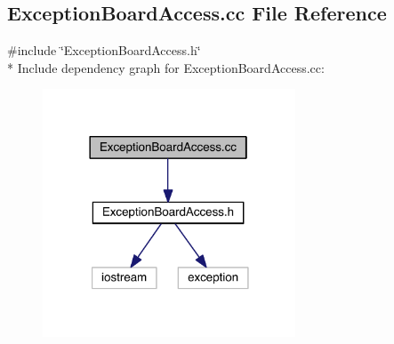 \hypertarget{a00101}{}\subsection{Exception\+Board\+Access.\+cc File Reference}
\label{a00101}
{\ttfamily \#include \char`\"{}Exception\+Board\+Access.\+h\char`\"{}}\\*
Include dependency graph for Exception\+Board\+Access.\+cc\+:\nopagebreak
\begin{figure}[H]
\begin{center}
\leavevmode
\includegraphics[width=213pt]{a00134}
\end{center}
\end{figure}
